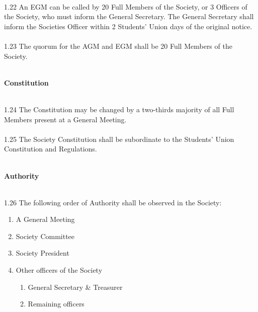 \documentclass[a4paper,twoside,notitlepage,11pt]{article}
\newcommand{\consHead}[1]{\begin{Large}\textbf{#1}\end{Large}\ \\}
\begin{document}
\ \\
1.22 An EGM can be called by 20 Full Members of the Society, or 3 Officers of the Society, who must inform the General Secretary. The General Secretary shall inform the Societies Officer within 2 Students' Union days of the original notice.\ \\
\ \\
1.23 The quorum for the AGM and EGM shall be 20 Full Members of the Society. 
\ \\
\ \\
\consHead{Constitution}
1.24	The Constitution may be changed by a two-thirds majority of all Full Members present at a General Meeting.\ \\
\ \\
1.25 The Society Constitution shall be subordinate to the Students' Union Constitution and Regulations.
\ \\
\ \\
\consHead{Authority}
1.26 The following order of Authority shall be observed in the Society:
\begin{enumerate}
	\item A General Meeting
	\item Society Committee
	\item Society President
	\item Other officers of the Society
	\begin{enumerate}
		\item General Secretary \& Treasurer
		\item Remaining officers
	\end{enumerate}
\end{enumerate}
\end{document}
